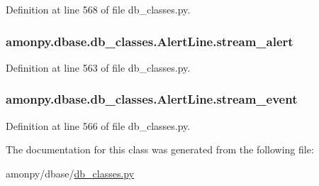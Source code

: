 Definition at line 568 of file db\-\_\-classes.\-py.

\hypertarget{classamonpy_1_1dbase_1_1db__classes_1_1_alert_line_ab24de2d5e3f4418dc2b9c6c68c42ae41}{
\subsubsection[{stream\-\_\-alert}]{\setlength{\rightskip}{0pt plus 5cm}amonpy.\-dbase.\-db\-\_\-classes.\-Alert\-Line.\-stream\-\_\-alert}}\label{classamonpy_1_1dbase_1_1db__classes_1_1_alert_line_ab24de2d5e3f4418dc2b9c6c68c42ae41}


Definition at line 563 of file db\-\_\-classes.\-py.

\hypertarget{classamonpy_1_1dbase_1_1db__classes_1_1_alert_line_a6081f9c41c7c34d54a565407f2308175}{
\subsubsection[{stream\-\_\-event}]{\setlength{\rightskip}{0pt plus 5cm}amonpy.\-dbase.\-db\-\_\-classes.\-Alert\-Line.\-stream\-\_\-event}}\label{classamonpy_1_1dbase_1_1db__classes_1_1_alert_line_a6081f9c41c7c34d54a565407f2308175}


Definition at line 566 of file db\-\_\-classes.\-py.



The documentation for this class was generated from the following file\-:\begin{DoxyCompactItemize}
\item 
amonpy/dbase/\hyperlink{db__classes_8py}{db\-\_\-classes.\-py}\end{DoxyCompactItemize}
